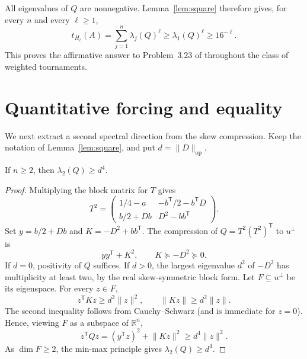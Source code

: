 \documentclass[acmsmall,screen,nonacm,11pt]{acmart}
\newcommand{\R}{\mathbb R}
\newcommand{\op}{\mathrm{op}}
\newcommand{\norm}[1]{\lVert #1\rVert}
\begin{document}
All eigenvalues of $Q$ are nonnegative. Lemma~\ref{lem:square} therefore gives, for every $n$ and every $\ell\geq1$,
\begin{equation}\label{eq:global}
 t_{H_\ell}(A)=\sum_{j=1}^n\lambda_j(Q)^\ell
        \geq \lambda_1(Q)^\ell\geq16^{-\ell}.
\end{equation}
This proves the affirmative answer to Problem~3.23 of \cite{HMNTW25} throughout the class of weighted tournaments.

\section{Quantitative forcing and equality}

We next extract a second spectral direction from the skew compression. Keep the notation of Lemma~\ref{lem:square}, and put $d=\norm{D}_{\op}$.

\begin{lemma}\label{lem:second}
If $n\geq2$, then $\lambda_2(Q)\geq d^4$.
\end{lemma}

\begin{proof}
Multiplying the block matrix for $T$ gives
\[
 T^2=\begin{pmatrix}
  1/4-a&-b^{\mathsf T}/2-b^{\mathsf T}D\\
  b/2+Db&D^2-bb^{\mathsf T}
 \end{pmatrix}.
\]
Set $y=b/2+Db$ and $K=-D^2+bb^{\mathsf T}$. The compression of $Q=T^2(T^2)^{\mathsf T}$ to $u^\perp$ is
\[
 yy^{\mathsf T}+K^2,
 \qquad K\succeq-D^2\succeq0.
\]
If $d=0$, positivity of $Q$ suffices. If $d>0$, the largest eigenvalue $d^2$ of $-D^2$ has multiplicity at least two, by the real skew-symmetric block form. Let $F\subseteq u^\perp$ be its eigenspace. For every $z\in F$,
\[
 z^{\mathsf T}Kz\geq d^2\norm{z}^2,
 \qquad \norm{Kz}\geq d^2\norm{z}.
\]
The second inequality follows from Cauchy--Schwarz (and is immediate for $z=0$). Hence, viewing $F$ as a subspace of $\R^n$,
\[
 z^{\mathsf T}Qz=(y^{\mathsf T}z)^2+\norm{Kz}^2
               \geq d^4\norm{z}^2.
\]
As $\dim F\geq2$, the min-max principle gives $\lambda_2(Q)\geq d^4$.
\end{proof}
\end{document}
